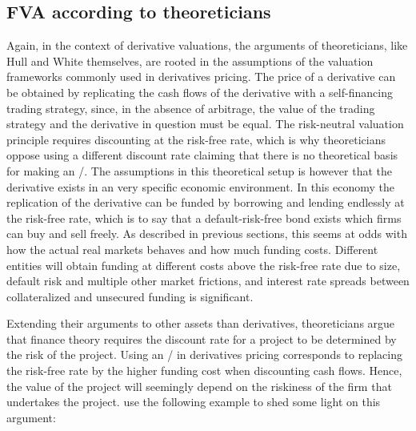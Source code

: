 \documentclass[main.tex]{subfiles}
\begin{document}
        \subsection{FVA according to theoreticians}
            Again, in the context of derivative valuations, 
            the arguments of theoreticians, like Hull and White themselves, 
            are rooted in the assumptions of the valuation frameworks commonly used in derivatives pricing.
            The price of a derivative can be obtained by replicating the cash flows of the derivative 
            with a self-financing trading strategy, since, in the absence of arbitrage, 
            the value of the trading strategy and the derivative in question must be equal.
            The risk-neutral valuation principle requires discounting at the risk-free rate,
            which is why theoreticians oppose using a different discount rate
            claiming that there is no theoretical basis for making an \FVA/.
            The assumptions in this theoretical setup is however 
            that the derivative exists in an very specific economic environment. 
            In this economy the replication of the derivative
            can be funded by borrowing and lending endlessly at the risk-free rate,
            which is to say that a default-risk-free bond exists which firms can buy and sell freely.
            As described in previous sections,
            this seems at odds with how the actual real markets behaves and how much funding costs.
            Different entities will obtain funding at different costs above the risk-free rate due to size,
            default risk and multiple other market frictions,
            and interest rate spreads between collateralized and unsecured funding is significant.

            Extending their arguments to other assets than derivatives, 
            theoreticians argue that finance theory requires the discount rate for a project 
            to be determined by the risk of the project.
            Using an \FVA/ in derivatives pricing corresponds to replacing the risk-free rate by the higher funding cost
            when discounting cash flows.
            Hence, the value of the project will seemingly depend on the riskiness of the firm that undertakes the project.
            \textcite{HullWhite2012FVA} use the following example to shed some light on this argument:
\end{document}
